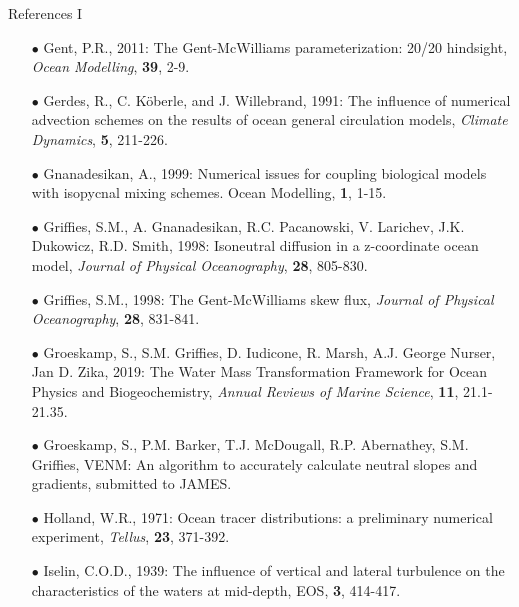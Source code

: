 \documentclass{beamer}
\begin{document}
\begin{frame}{References I}
\begin{itemize}
\item[$\bullet$] Gent, P.R., 2011: The Gent-McWilliams parameterization: 20/20 hindsight, {\it Ocean Modelling}, {\bf 39}, 2-9. 

\item[$\bullet$] Gerdes, R., C. {K\"{o}berle}, and J. Willebrand, 1991: The influence of numerical advection schemes on the results of ocean general circulation models, {\it Climate Dynamics}, {\bf 5}, 211-226.

\item[$\bullet$] Gnanadesikan, A., 1999: Numerical issues for coupling biological models with isopycnal mixing schemes. Ocean Modelling, {\bf 1}, 1-15.  

\item[$\bullet$] Griffies, S.M., A. Gnanadesikan, R.C. Pacanowski, V. Larichev, J.K. Dukowicz, R.D. Smith, 1998: Isoneutral diffusion in a z-coordinate ocean model, {\it Journal of Physical Oceanography}, {\bf 28}, 805-830. 

\item[$\bullet$] Griffies, S.M., 1998: The Gent-McWilliams skew flux, {\it Journal of Physical Oceanography}, {\bf 28}, 831-841.

\item[$\bullet$] Groeskamp, S., S.M. Griffies, 
D. Iudicone, R. Marsh, A.J. George Nurser, Jan D. Zika, 2019: The Water Mass Transformation Framework for Ocean Physics and Biogeochemistry,  {\it Annual Reviews of Marine Science}, {\bf 11}, 21.1-21.35.

\item[$\bullet$] Groeskamp, S., P.M. Barker,  T.J. McDougall, R.P. Abernathey, S.M. Griffies, 
VENM: An algorithm to accurately calculate neutral slopes and gradients, submitted to JAMES. 

\item[$\bullet$] Holland, W.R., 1971: Ocean tracer distributions: a preliminary numerical experiment,
{\it Tellus}, {\bf 23}, 371-392.

\item[$\bullet$] Iselin, C.O.D., 1939: The influence of vertical and lateral turbulence on the characteristics of the waters at mid-depth, EOS, {\bf 3}, 414-417.



\end{itemize}


\end{frame}
\end{document}
